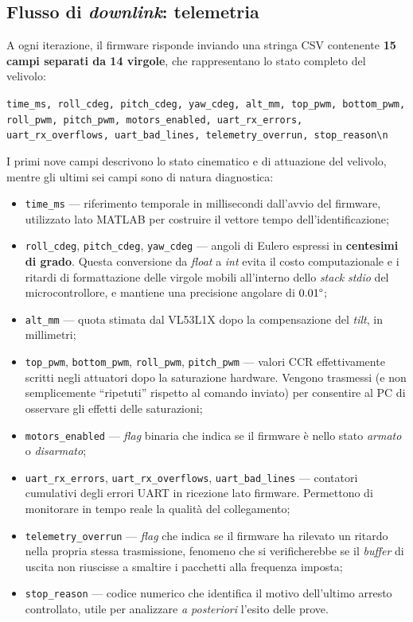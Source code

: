 \documentclass[11pt]{report}
\begin{document}
	\subsection{Flusso di \textit{downlink}: telemetria}
	A ogni iterazione, il firmware risponde inviando una stringa CSV contenente \textbf{15 campi separati da 14 virgole}, che rappresentano lo stato completo del velivolo:
	\begin{center}
		\small\texttt{time\_ms, roll\_cdeg, pitch\_cdeg, yaw\_cdeg, alt\_mm, top\_pwm, bottom\_pwm, roll\_pwm, pitch\_pwm, motors\_enabled, uart\_rx\_errors, uart\_rx\_overflows, uart\_bad\_lines, telemetry\_overrun, stop\_reason\textbackslash n}
	\end{center}
	I primi nove campi descrivono lo stato cinematico e di attuazione del velivolo, mentre gli ultimi sei campi sono di natura diagnostica:
	\begin{itemize}
		\item \texttt{time\_ms} --- riferimento temporale in millisecondi dall'avvio del firmware, utilizzato lato MATLAB per costruire il vettore tempo dell'identificazione;
		\item \texttt{roll\_cdeg}, \texttt{pitch\_cdeg}, \texttt{yaw\_cdeg} --- angoli di Eulero espressi in \textbf{centesimi di grado}. Questa conversione da \textit{float} a \textit{int} evita il costo computazionale e i ritardi di formattazione delle virgole mobili all'interno dello \textit{stack} \textit{stdio} del microcontrollore, e mantiene una precisione angolare di $0.01\degree$;
		\item \texttt{alt\_mm} --- quota stimata dal VL53L1X dopo la compensazione del \textit{tilt}, in millimetri;
		\item \texttt{top\_pwm}, \texttt{bottom\_pwm}, \texttt{roll\_pwm}, \texttt{pitch\_pwm} --- valori CCR effettivamente scritti negli attuatori dopo la saturazione hardware. Vengono trasmessi (e non semplicemente ``ripetuti'' rispetto al comando inviato) per consentire al PC di osservare gli effetti delle saturazioni;
		\item \texttt{motors\_enabled} --- \textit{flag} binaria che indica se il firmware è nello stato \textit{armato} o \textit{disarmato};
		\item \texttt{uart\_rx\_errors}, \texttt{uart\_rx\_overflows}, \texttt{uart\_bad\_lines} --- contatori cumulativi degli errori UART in ricezione lato firmware. Permettono di monitorare in tempo reale la qualità del collegamento;
		\item \texttt{telemetry\_overrun} --- \textit{flag} che indica se il firmware ha rilevato un ritardo nella propria stessa trasmissione, fenomeno che si verificherebbe se il \textit{buffer} di uscita non riuscisse a smaltire i pacchetti alla frequenza imposta;
		\item \texttt{stop\_reason} --- codice numerico che identifica il motivo dell'ultimo arresto controllato, utile per analizzare \textit{a posteriori} l'esito delle prove.
	\end{itemize}
	
\end{document}
